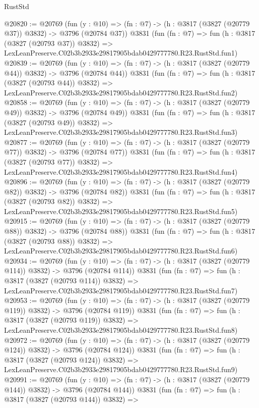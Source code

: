 \begin{lexlean}{RustStd}
\begin{coremodule}
@20820 := @20769
    (fun (y : @10) => (fn : @7) -> (h : @3817 (@3827 (@20779 @37)) @3832) -> @3796 (@20784 @37))
    @3831
    (fun (fn : @7) =>
    fun (h : @3817 (@3827 (@20793 @37)) @3832) =>
    LexLeanPreserve.C02b3b2933e29817905bdab0429777780.R23.RustStd.fun1)
@20839 := @20769
    (fun (y : @10) => (fn : @7) -> (h : @3817 (@3827 (@20779 @44)) @3832) -> @3796 (@20784 @44))
    @3831
    (fun (fn : @7) =>
    fun (h : @3817 (@3827 (@20793 @44)) @3832) =>
    LexLeanPreserve.C02b3b2933e29817905bdab0429777780.R23.RustStd.fun2)
@20858 := @20769
    (fun (y : @10) => (fn : @7) -> (h : @3817 (@3827 (@20779 @49)) @3832) -> @3796 (@20784 @49))
    @3831
    (fun (fn : @7) =>
    fun (h : @3817 (@3827 (@20793 @49)) @3832) =>
    LexLeanPreserve.C02b3b2933e29817905bdab0429777780.R23.RustStd.fun3)
@20877 := @20769
    (fun (y : @10) => (fn : @7) -> (h : @3817 (@3827 (@20779 @77)) @3832) -> @3796 (@20784 @77))
    @3831
    (fun (fn : @7) =>
    fun (h : @3817 (@3827 (@20793 @77)) @3832) =>
    LexLeanPreserve.C02b3b2933e29817905bdab0429777780.R23.RustStd.fun4)
@20896 := @20769
    (fun (y : @10) => (fn : @7) -> (h : @3817 (@3827 (@20779 @82)) @3832) -> @3796 (@20784 @82))
    @3831
    (fun (fn : @7) =>
    fun (h : @3817 (@3827 (@20793 @82)) @3832) =>
    LexLeanPreserve.C02b3b2933e29817905bdab0429777780.R23.RustStd.fun5)
@20915 := @20769
    (fun (y : @10) => (fn : @7) -> (h : @3817 (@3827 (@20779 @88)) @3832) -> @3796 (@20784 @88))
    @3831
    (fun (fn : @7) =>
    fun (h : @3817 (@3827 (@20793 @88)) @3832) =>
    LexLeanPreserve.C02b3b2933e29817905bdab0429777780.R23.RustStd.fun6)
@20934 := @20769
    (fun (y : @10) => (fn : @7) -> (h : @3817 (@3827 (@20779 @114)) @3832) -> @3796 (@20784 @114))
    @3831
    (fun (fn : @7) =>
    fun (h : @3817 (@3827 (@20793 @114)) @3832) =>
    LexLeanPreserve.C02b3b2933e29817905bdab0429777780.R23.RustStd.fun7)
@20953 := @20769
    (fun (y : @10) => (fn : @7) -> (h : @3817 (@3827 (@20779 @119)) @3832) -> @3796 (@20784 @119))
    @3831
    (fun (fn : @7) =>
    fun (h : @3817 (@3827 (@20793 @119)) @3832) =>
    LexLeanPreserve.C02b3b2933e29817905bdab0429777780.R23.RustStd.fun8)
@20972 := @20769
    (fun (y : @10) => (fn : @7) -> (h : @3817 (@3827 (@20779 @124)) @3832) -> @3796 (@20784 @124))
    @3831
    (fun (fn : @7) =>
    fun (h : @3817 (@3827 (@20793 @124)) @3832) =>
    LexLeanPreserve.C02b3b2933e29817905bdab0429777780.R23.RustStd.fun9)
@20991 := @20769
    (fun (y : @10) => (fn : @7) -> (h : @3817 (@3827 (@20779 @144)) @3832) -> @3796 (@20784 @144))
    @3831
    (fun (fn : @7) =>
    fun (h : @3817 (@3827 (@20793 @144)) @3832) =>

\end{coremodule}
\end{lexlean}
